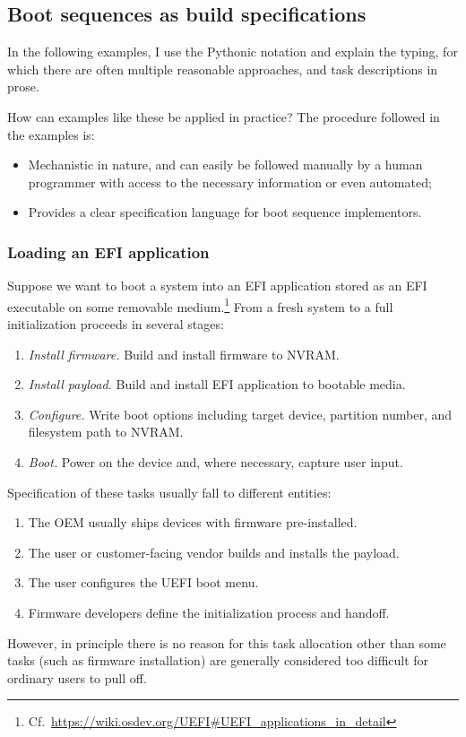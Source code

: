 \subsection{Boot sequences as build specifications}

In the following examples, I use the Pythonic notation and explain the typing, for which there are often multiple reasonable approaches, and task descriptions in prose.

How can examples like these be applied in practice?
%
The procedure followed in the examples is:
\begin{itemize}
  \item Mechanistic in nature, and can easily be followed manually by a human programmer with access to the necessary information or even automated;
  \item Provides a clear specification language for boot sequence implementors.
\end{itemize}

\subsubsection{Loading an EFI application} \label{efi-boot}

Suppose we want to boot a system into an EFI application stored as an EFI executable on some removable medium.\footnote{Cf.~\url{https://wiki.osdev.org/UEFI\#UEFI\_applications\_in\_detail}}
%
From a fresh system to a full initialization proceeds in several stages:
%
\begin{enumerate}
  \item \emph{Install firmware.} Build and install firmware to NVRAM.
  \item \emph{Install payload.} Build and install EFI application to bootable media.
  \item \emph{Configure.} Write boot options including target device, partition number, and filesystem path to NVRAM.
  \item \emph{Boot.} Power on the device and, where necessary, capture user input.
\end{enumerate}
%
Specification of these tasks usually fall to different entities:
%
\begin{enumerate}
  \item The OEM usually ships devices with firmware pre-installed.
  \item The user or customer-facing vendor builds and installs the payload.
  \item The user configures the UEFI boot menu.
  \item Firmware developers define the initialization process and handoff.
\end{enumerate}
%
However, in principle there is no reason for this task allocation other than some tasks (such as firmware installation) are generally considered too difficult for ordinary users to pull off.

